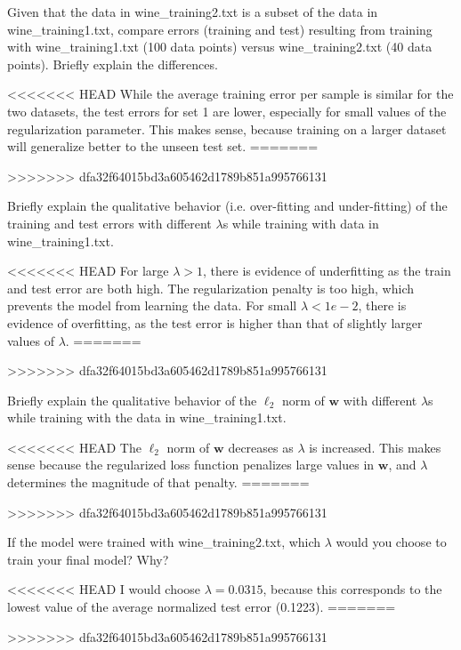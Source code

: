 \problem[4]
Given that the data in wine\_training2.txt is a subset of the data in wine\_training1.txt, compare errors (training and test) resulting from training with wine\_training1.txt (100 data points) versus wine\_training2.txt (40 data points). Briefly explain the differences.

\begin{solution}
<<<<<<< HEAD
  While the average training error per sample is similar for the two datasets, the test errors for set 1 are lower, especially for small values of the regularization parameter. This makes sense, because training on a larger dataset will generalize better to the unseen test set.
=======

>>>>>>> dfa32f64015bd3a605462d1789b851a995766131
\end{solution}

\problem[4]
Briefly explain the qualitative behavior (i.e. over-fitting and under-fitting) of the training and test errors with different $\lambda$s while training with data in wine\_training1.txt.

\begin{solution}
<<<<<<< HEAD
  For large $\lambda > 1$, there is evidence of underfitting as the train and test error are both high. The regularization penalty is too high, which prevents the model from learning the data. For small $\lambda < 1e-2$, there is evidence of overfitting, as the test error is higher than that of slightly larger values of $\lambda$.
=======

>>>>>>> dfa32f64015bd3a605462d1789b851a995766131
\end{solution}

\problem[4]
Briefly explain the qualitative behavior of the $\ell_2$ norm of $\textbf{w}$ with different $\lambda$s while training with the data in wine\_training1.txt.

\begin{solution}
<<<<<<< HEAD
 The $\ell_2$ norm of $\textbf{w}$ decreases as $\lambda$ is increased. This makes sense because the regularized loss function penalizes large values in $\textbf{w}$, and $\lambda$ determines the magnitude of that penalty.
=======
   
>>>>>>> dfa32f64015bd3a605462d1789b851a995766131
\end{solution}

\problem[4]
If the model were trained with wine\_training2.txt, which $\lambda$ would you choose to train your final model? Why?

\begin{solution}
<<<<<<< HEAD
  I would choose $\lambda = 0.0315$, because this corresponds to the lowest value of the average normalized test error (0.1223).
=======
  
>>>>>>> dfa32f64015bd3a605462d1789b851a995766131
\end{solution}

